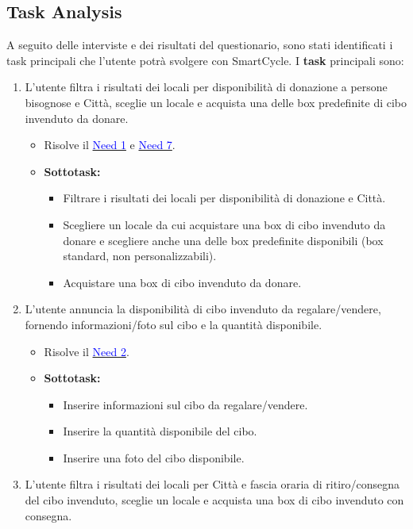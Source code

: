 \documentclass{article}
\begin{document}
\subsection{Task Analysis}
A seguito delle interviste e dei risultati del questionario, sono stati identificati i task principali che l'utente potrà svolgere con SmartCycle.
\newline
I \textbf{task} principali sono:
\begin{enumerate}[label=\textbf{Task-\arabic*}]
    \item L'utente filtra i risultati dei locali per disponibilità di donazione a persone bisognose e Città, sceglie un locale e acquista una delle box predefinite di cibo invenduto da donare.
    \begin{itemize}
        \item Risolve il \hyperref[need1]{\textcolor{blue}{Need 1}} e \hyperref[need7]{\textcolor{blue}{Need 7}}.
        \item \textbf{Sottotask:} 
        \begin{itemize}
            \item Filtrare i risultati dei locali per disponibilità di donazione e Città.
            \item Scegliere un locale da cui acquistare una box di cibo invenduto da donare e scegliere anche una delle box predefinite disponibili (box standard, non personalizzabili).
            \item Acquistare una box di cibo invenduto da donare.
        \end{itemize}
    \end{itemize}
    \item L'utente annuncia la disponibilità di cibo invenduto da regalare/vendere, fornendo informazioni/foto sul cibo e la quantità disponibile.
    \begin{itemize}
        \item Risolve il \hyperref[need2]{\textcolor{blue}{Need 2}}.
        \item \textbf{Sottotask:} 
        \begin{itemize}
            \item Inserire informazioni sul cibo da regalare/vendere.
            \item Inserire la quantità disponibile del cibo.
            \item Inserire una foto del cibo disponibile.
        \end{itemize}
    \end{itemize}
    \item L'utente filtra i risultati dei locali per Città e fascia oraria di ritiro/consegna del cibo invenduto, sceglie un locale e acquista una box di cibo invenduto con consegna.

\end{enumerate}
\end{document}
